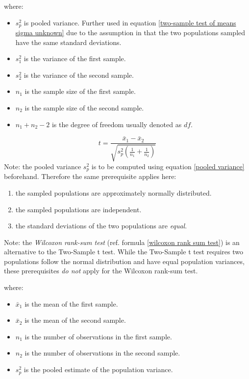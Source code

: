 where:
\begin{itemize}
 \item $s^{2}_{p}$ is pooled variance. Further used in equation \eqref{two-sample test of means sigma unknown} due to the assumption in that the two populations sampled have the same standard deviations.
 \item $s^{2}_{1}$ is the variance of the first sample.
 \item $s^{2}_{2}$ is the variance of the second sample.
 \item $n_{1}$ is the sample size of the first sample.
 \item $n_{2}$ is the sample size of the second sample.
 \item $n_{1}+n_{2}-2$ is the degree of freedom usually denoted as $df$.
\end{itemize} 
\hformbar


\begin{equation}
\label{two-sample test of means sigma unknown}
t = \frac{\bar{x}_{1} - \bar{x}_{2}}{\sqrt{s^{2}_{p}(\frac{1}{n_{1}}+\frac{1}{n_{2}})}}
\end{equation}
Note: the pooled variance $s^{2}_{p}$ is to be computed using equation \eqref{pooled variance} beforehand. Therefore the same prerequisite applies here:
\begin{enumerate}
 \item the sampled populations are approximately normally distributed.
 \item the sampled populations are independent.
 \item the standard deviations of the two populations are \textit{equal}.
\end{enumerate}

Note: the \textit{Wilcoxon rank-sum test} (ref. formula \eqref{wilcoxon rank sum test}) is an alternative to the Two-Sample t test. While the Two-Sample t test requires two populations follow the normal distribution and have equal population variances, these prerequisites \textit{do not} apply for the Wilcoxon rank-sum test.

where:
\begin{itemize}
 \item $\bar{x}_{1}$ is the mean of the first sample.
 \item $\bar{x}_{2}$ is the mean of the second sample.
 \item $n_{1}$ is the number of observations in the first sample. 
 \item $n_{2}$ is the number of observations in the second sample.
 \item $s^{2}_{p}$ is the pooled estimate of the population variance.
\end{itemize}
\hformbar


